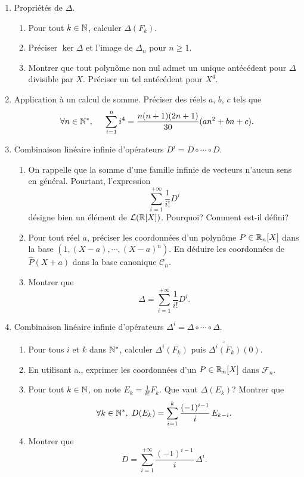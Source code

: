 \begin{enumerate}
 \item Propriétés de $\Delta$.
 \begin{enumerate}
  \item Pour tout $k\in\mathbb{N}$, calculer $\Delta(F_k)$.
  \item Préciser $\ker \Delta$ et l'image de $\Delta_n$ pour $n\geq 1$.
  \item Montrer que tout polynôme non nul admet un unique antécédent pour $\Delta$ divisible par $X$. Préciser un tel antécédent pour $X^4$.
 \end{enumerate}

 \item Application à un calcul de somme. 
 Préciser des réels $a$, $b$, $c$ tels que
\[
 \forall n \in \mathbb{N}^*, \hspace{0.5cm}
 \sum_{i = 1}^{n}i^4 = 
 \frac{n(n+1)(2n+1)}{30}(an^2 + bn + c).
\]

 \item Combinaison linéaire infinie d'opérateurs $D^i = D \circ \cdots \circ D$.
 \begin{enumerate}
  \item On rappelle que la somme d'une famille infinie de vecteurs n'aucun sens en général. Pourtant, l'expression 
  \[
  \sum_{i=1}^{+\infty}\frac{1}{i!}D^i
  \]
  désigne bien un élément de $\mathcal{L}(\mathbb{R}[X])$. Pourquoi?  Comment est-il défini? 
  \item Pour tout réel $a$, préciser les coordonnées d'un polynôme $P \in \mathbb{R}_n[X]$ dans la base $\left( 1,(X-a),\cdots,(X-a)^n\right) $. En déduire les coordonnées de $\widehat{P}(X+a)$ dans la base canonique $\mathcal{C}_n$.
  \item Montrer que 
    \[
  \Delta = \sum_{i=1}^{+\infty}\frac{1}{i!}D^i.
  \]

 \end{enumerate}

 \item Combinaison linéaire infinie d'opérateurs $\Delta ^i = \Delta \circ \cdots \circ \Delta$.
 \begin{enumerate}
  
  \item Pour tous $i$ et $k$ dans $\mathbb{N}^*$, calculer $\Delta ^i(F_k)$ puis $\widetilde{\Delta ^i(F_k)}(0)$.
  \item En utilisant a., exprimer les coordonnées d'un $P\in \mathbb{R}_n[X]$ dans $\mathcal{F}_n$.

  \item Pour tout $k\in \mathbb{N}$, on note $E_k = \frac{1}{k!}F_k$. Que vaut $\Delta(E_k)$? Montrer que 
\[
 \forall k \in \mathbb{N}^*, \; D(E_k) = \sum_{i=1}^{k}\frac{(-1)^{i-1}}{i}\,E_{k-i}. 
\]

 \item Montrer que
\[
 D = \sum_{i=1}^{+\infty} \frac{(-1)^{i-1}}{i}\, \Delta^i.
\]
 
 \end{enumerate}

\end{enumerate}
